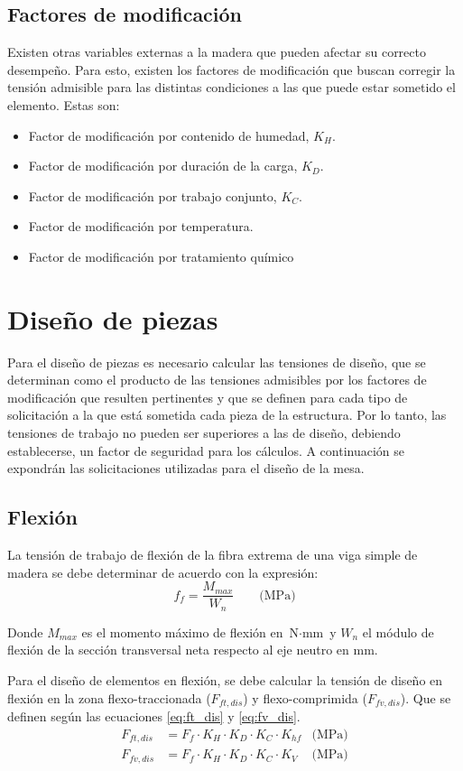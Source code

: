 \subsection{Factores de modificación}
Existen otras variables externas a la madera que pueden afectar su correcto desempeño. Para esto, existen los factores de modificación que buscan corregir la tensión admisible para las distintas condiciones a las que puede estar sometido el elemento. Estas son:
\begin{itemize}
	\item Factor de modificación por contenido de humedad, $K_H$.
	\item Factor de modificación por duración de la carga, $K_D$.
	\item Factor de modificación por trabajo conjunto, $K_C$.
	\item Factor de modificación por temperatura.
	\item Factor de modificación por tratamiento químico
\end{itemize}

\section{Diseño de piezas}
Para el diseño de piezas es necesario calcular las tensiones de diseño, que se determinan como el producto de las tensiones admisibles por los factores de modificación que resulten pertinentes y que se definen para cada tipo de solicitación a la que está sometida cada pieza de la estructura. Por lo tanto, las tensiones de trabajo no pueden ser superiores a las de diseño, debiendo establecerse, un factor de seguridad para los cálculos. A continuación se expondrán las solicitaciones utilizadas para el diseño de la mesa.

\subsection{Flexión}
La tensión de trabajo de flexión de la fibra extrema de una viga simple de madera se debe determinar de acuerdo con la expresión:
\begin{equation} \label{eq:f_f}
	f_f=\frac{M_{max}}{W_n} \qquad \text{(MPa)}
\end{equation}

Donde $M_{max}$ es el momento máximo de flexión en $\text{N}\cdot\text{mm}$ y $W_n$ el módulo de flexión de la sección transversal neta respecto al eje neutro en mm.

Para el diseño de elementos en flexión, se debe calcular la tensión de diseño en flexión en la zona flexo-traccionada ($F_{ft,dis}$) y flexo-comprimida ($F_{fv,dis}$). Que se definen según las ecuaciones \ref{eq:ft_dis} y \ref{eq:fv_dis}.
\begin{subequations}
\begin{align}
	F_{ft,dis}&=F_f \cdot K_H \cdot K_D \cdot K_C \cdot K_{hf} &\text{(MPa)} \label{eq:ft_dis}\\	
	F_{fv,dis}&=F_f \cdot K_H \cdot K_D \cdot K_C \cdot K_V &\text{(MPa)}	 \label{eq:fv_dis}
\end{align}
\end{subequations}

